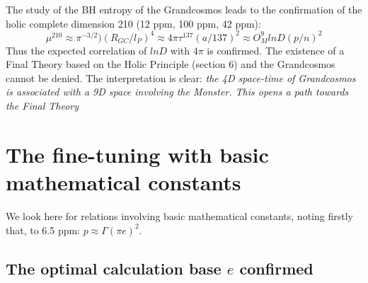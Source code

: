 \documentclass[twoside,draft]{article}
\begin{document}
\begin{sloppypar}
The study of the BH entropy of the Grandcosmos leads to the confirmation of the holic complete dimension 210 (12 ppm, 100 ppm, 42 ppm):
\begin{equation}
\mu^{210} \approx \pi^{-3/2})(R_{GC}/l_P)^4 \approx 4\pi \tau^137 (a/137)^2 \approx O_M^9 lnD (p/n)^2
\end{equation}
Thus the expected correlation \cite{Witten} \cite{Sanchez5} of $lnD$ with $4\pi$ is confirmed. The existence of a Final Theory based on the Holic Principle (section 6) and the Grandcosmos cannot be denied. The interpretation is clear: \textit{the 4D space-time of Grandcosmos is associated with a 9D space involving the Monster. This opens a path towards the Final Theory}

\section{The fine-tuning with basic mathematical constants}

We look here for relations involving basic mathematical constants, noting firstly that, to 6.5 ppm:
$p \approx \Gamma (\pi e)^2$. 

\subsection {The optimal calculation base $e$ confirmed}


\end{sloppypar}
\end{document}
